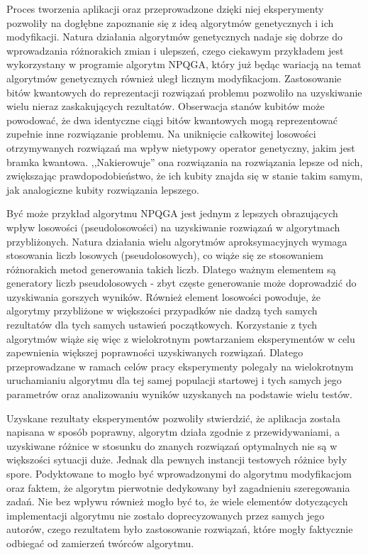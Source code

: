 Proces tworzenia aplikacji oraz przeprowadzone dzięki niej eksperymenty pozwoliły na dogłębne zapoznanie się z ideą algorytmów genetycznych i ich modyfikacji. Natura działania algorytmów genetycznych nadaje się dobrze do wprowadzania różnorakich zmian i ulepszeń, czego ciekawym przykładem jest wykorzystany w programie algorytm NPQGA, który już będąc wariacją na temat algorytmów genetycznych również uległ licznym modyfikacjom. Zastosowanie bitów kwantowych do reprezentacji rozwiązań problemu pozwoliło na uzyskiwanie wielu nieraz zaskakujących rezultatów. Obserwacja stanów kubitów może powodować, że dwa identyczne ciągi bitów kwantowych mogą reprezentować zupełnie inne rozwiązanie problemu. Na uniknięcie całkowitej losowości otrzymywanych rozwiązań ma wpływ nietypowy operator genetyczny, jakim jest bramka kwantowa. ,,Nakierowuje'' ona rozwiązania na rozwiązania lepsze od nich, zwiększając prawdopodobieństwo, że  ich kubity znajda się w stanie takim samym, jak analogiczne kubity rozwiązania lepszego.

Być może przykład algorytmu NPQGA jest jednym z lepszych obrazujących wpływ losowości (pseudolosowości) na uzyskiwanie rozwiązań w algorytmach przybliżonych. Natura działania wielu algorytmów aproksymacyjnych wymaga stosowania liczb losowych (pseudolosowych), co wiąże się ze stosowaniem różnorakich metod generowania takich liczb. Dlatego ważnym elementem są generatory liczb pseudolosowych - zbyt częste generowanie może doprowadzić do uzyskiwania gorszych wyników. Również element losowości powoduje, że algorytmy przybliżone w większości przypadków nie dadzą tych samych rezultatów dla tych samych ustawień początkowych. Korzystanie z tych algorytmów wiąże się więc z wielokrotnym powtarzaniem eksperymentów w celu zapewnienia większej poprawności uzyskiwanych rozwiązań. Dlatego przeprowadzane w ramach celów pracy eksperymenty polegały na wielokrotnym uruchamianiu algorytmu dla tej samej populacji startowej i tych samych jego parametrów oraz analizowaniu wyników uzyskanych na podstawie wielu testów.

Uzyskane rezultaty eksperymentów pozwoliły stwierdzić, że aplikacja została napisana w sposób poprawny, algorytm działa zgodnie z przewidywaniami, a uzyskiwane różnice w stosunku do znanych rozwiązań optymalnych nie są w większości sytuacji duże. Jednak dla pewnych instancji testowych różnice były spore. Podyktowane to mogło być wprowadzonymi do algorytmu modyfikacjom oraz faktem, że algorytm pierwotnie dedykowany był zagadnieniu szeregowania zadań. Nie bez wpływu również mogło być to, że wiele elementów dotyczących implementacji algorytmu nie zostało doprecyzowanych przez samych jego autorów, czego rezultatem było zastosowanie rozwiązań, które mogły faktycznie odbiegać od zamierzeń twórców algorytmu. 